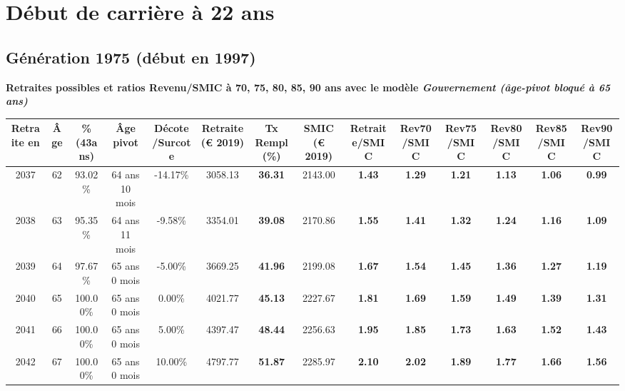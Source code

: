  \addto{\captionsenglish}{ \renewcommand{\mtctitle}{}} \setcounter{minitocdepth}{2} 
 \minitoc \newpage 

\section{Début de carrière à 22 ans} 

\subsection{Génération 1975 (début en 1997)} 

{\bf \noindent Retraites possibles et ratios Revenu/SMIC à 70, 75, 80, 85, 90 ans avec le modèle \emph{Gouvernement (âge-pivot bloqué à 65 ans)}}  
 
\begin{adjustbox}{max width=\textwidth} 
\begin{tabular}[htb]{|c|c||c|c|c||c|c||c||c|c|c|c|c|c|} 
\hline 
 Retraite en &  Âge &  \%(43ans) &  Âge pivot &  Décote/Surcote &  Retraite (\euro{} 2019) &  Tx Rempl(\%) &  SMIC (\euro{} 2019) &  Retraite/SMIC &  Rev70/SMIC &  Rev75/SMIC &  Rev80/SMIC &  Rev85/SMIC &  Rev90/SMIC \\ 
\hline \hline 
 2037 &  62 &  93.02\% &  64 ans 10 mois &  -14.17\% &  3058.13 &  {\bf 36.31} &  2143.00 &  {\bf 1.43} &  {\bf 1.29} &  {\bf 1.21} &  {\bf 1.13} &  {\bf 1.06} &  {\bf {\color{red} 0.99}} \\ 
\hline 
 2038 &  63 &  95.35\% &  64 ans 11 mois &  -9.58\% &  3354.01 &  {\bf 39.08} &  2170.86 &  {\bf 1.55} &  {\bf 1.41} &  {\bf 1.32} &  {\bf 1.24} &  {\bf 1.16} &  {\bf 1.09} \\ 
\hline 
 2039 &  64 &  97.67\% &  65 ans 0 mois &  -5.00\% &  3669.25 &  {\bf 41.96} &  2199.08 &  {\bf 1.67} &  {\bf 1.54} &  {\bf 1.45} &  {\bf 1.36} &  {\bf 1.27} &  {\bf 1.19} \\ 
\hline 
 2040 &  65 &  100.00\% &  65 ans 0 mois &  0.00\% &  4021.77 &  {\bf 45.13} &  2227.67 &  {\bf 1.81} &  {\bf 1.69} &  {\bf 1.59} &  {\bf 1.49} &  {\bf 1.39} &  {\bf 1.31} \\ 
\hline 
 2041 &  66 &  100.00\% &  65 ans 0 mois &  5.00\% &  4397.47 &  {\bf 48.44} &  2256.63 &  {\bf 1.95} &  {\bf 1.85} &  {\bf 1.73} &  {\bf 1.63} &  {\bf 1.52} &  {\bf 1.43} \\ 
\hline 
 2042 &  67 &  100.00\% &  65 ans 0 mois &  10.00\% &  4797.77 &  {\bf 51.87} &  2285.97 &  {\bf 2.10} &  {\bf 2.02} &  {\bf 1.89} &  {\bf 1.77} &  {\bf 1.66} &  {\bf 1.56} \\ 
\hline 
\hline 
\end{tabular} 
\end{adjustbox} 
 
